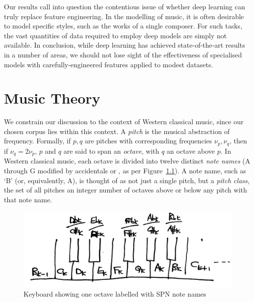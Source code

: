 \documentclass[12pt,a4paper,twoside,openright]{report}
\newcommand{\insharp}[0]{\sharp[raise=0.1,scale=0.8]}
\newcommand{\inflat}[0]{\flat[raise=0.1,scale=0.8]}
\begin{document}
Our results call into question the contentious issue of whether deep learning
can truly replace feature engineering. In the modelling of music, it is often
desirable to model specific styles, such as the works of a single composer. For
such tasks, the vast quantities of data required to employ deep models are
simply not available. In conclusion, while deep learning has achieved
state-of-the-art results in a number of areas, we should not lose sight of the
effectiveness of specialised models with carefully-engineered features applied
to modest datasets.

\printbibliography
{}

\appendix

\chapter{Music Theory}\label{chap:music-theory}

We constrain our discussion to the context of Western classical music, since our
chosen corpus lies within this context. A \emph{pitch} is the musical
abstraction of frequency.  Formally, if $p,q$ are pitches with corresponding
frequencies $\nu_p,\nu_q$, then if $\nu_q = 2\nu_p$, $p$ and $q$ are said to
span an \emph{octave}, with $q$ an octave above $p$. In Western classical music,
each octave is divided into twelve distinct \emph{note names} (A through G
modified by accidentals \insharp{} or \inflat{}, as per
Figure~\ref{fig:keyboard-spn}). A note name, such as `B\inflat' (or,
equivalently, A\insharp), is thought of as not just a single pitch, but a
\emph{pitch class}, the set of all pitches an integer number of octaves above or
below any pitch with that note name.  

\begin{figure}[H]
\centering
\includegraphics[width=350pt]{figs/piano_spn_tmp.jpg}
\caption{Keyboard showing one octave labelled with SPN note names}
\label{fig:keyboard-spn}
\end{figure}
\end{document}
